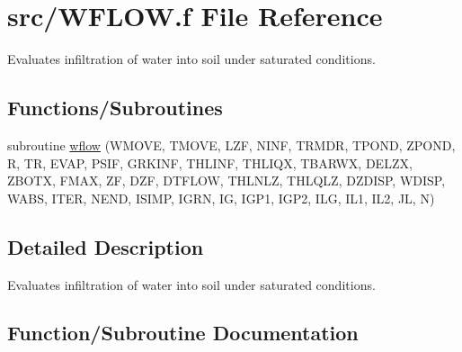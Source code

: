 \hypertarget{WFLOW_8f}{}\section{src/\+W\+F\+L\+O\+W.f File Reference}
\label{WFLOW_8f}


Evaluates infiltration of water into soil under saturated conditions.  


\subsection*{Functions/\+Subroutines}
\begin{DoxyCompactItemize}
\item 
subroutine \hyperlink{WFLOW_8f_a7a3409d93e2e44adae8e38e9ddd99f97}{wflow} (W\+M\+O\+V\+E, T\+M\+O\+V\+E, L\+Z\+F, N\+I\+N\+F, T\+R\+M\+D\+R, T\+P\+O\+N\+D, Z\+P\+O\+N\+D, R, T\+R, E\+V\+A\+P, P\+S\+I\+F, G\+R\+K\+I\+N\+F, T\+H\+L\+I\+N\+F, T\+H\+L\+I\+Q\+X, T\+B\+A\+R\+W\+X, D\+E\+L\+Z\+X, Z\+B\+O\+T\+X, F\+M\+A\+X, Z\+F, D\+Z\+F, D\+T\+F\+L\+O\+W, T\+H\+L\+N\+L\+Z, T\+H\+L\+Q\+L\+Z, D\+Z\+D\+I\+S\+P, W\+D\+I\+S\+P, W\+A\+B\+S, I\+T\+E\+R, N\+E\+N\+D, I\+S\+I\+M\+P, I\+G\+R\+N, I\+G, I\+G\+P1, I\+G\+P2, I\+L\+G, I\+L1, I\+L2, J\+L, N)
\end{DoxyCompactItemize}


\subsection{Detailed Description}
Evaluates infiltration of water into soil under saturated conditions. 



\subsection{Function/\+Subroutine Documentation}
\hypertarget{WFLOW_8f_a7a3409d93e2e44adae8e38e9ddd99f97}{}
